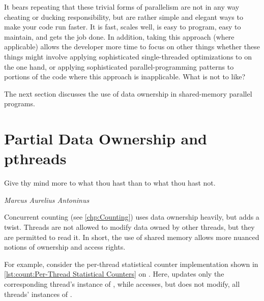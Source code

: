 It bears repeating that these trivial forms of parallelism are not in
any way cheating or ducking responsibility, but are rather simple and
elegant ways to make your code run faster.
It is fast, scales well, is easy to program, easy to maintain, and
gets the job done.
In addition, taking this approach (where applicable) allows the developer
more time to focus on other things whether these things might involve
applying sophisticated single-threaded optimizations to 
on the one hand, or applying sophisticated parallel-programming patterns
to portions of the code where this approach is inapplicable.
What is not to like?

The next section discusses the use of data ownership in shared-memory
parallel programs.

\section{Partial Data Ownership and pthreads}
\label{sec:owned:Partial Data Ownership and pthreads}
%
\epigraph{Give thy mind more to what thou hast than to what thou hast not.}
	 {\emph{Marcus Aurelius Antoninus}}

Concurrent counting (see \cref{chp:Counting}) uses data ownership heavily,
but adds a twist.
Threads are not allowed to modify data owned by other threads,
but they are permitted to read it.
In short, the use of shared memory allows more nuanced notions
of ownership and access rights.

For example, consider the per-thread statistical counter implementation
shown in
\cref{lst:count:Per-Thread Statistical Counters} on
.
Here,  updates only the corresponding thread's
instance of ,
while  accesses, but does not modify, all
threads' instances of .

\QuickQuizEnd

